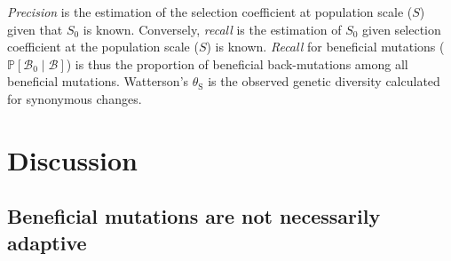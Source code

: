 \documentclass{article}
\newcommand{\proba}{\mathbb{P}}
\newcommand{\Sphy}{S_{0}}
\newcommand{\SphyBen}{\mathcal{B}_0}
\newcommand{\given}{\mid}
\newcommand{\Spop}{S}
\newcommand{\SpopBen}{\mathcal{B}}
\newcommand{\thetaSyn}{\theta_{\text{S}}}
\begin{document}
\begin{table}[tb]
{            \textit{Precision} is the estimation of the selection coefficient at population scale ($\Spop$) given that $\Sphy$ is known.
            Conversely, \textit{recall} is the estimation of $\Sphy$ given selection coefficient at the population scale ($\Spop$) is known.
            \textit{Recall} for beneficial mutations ($\proba [\SphyBen \given \SpopBen]$) is thus the proportion of beneficial back-mutations among all beneficial mutations.
            Watterson's $\thetaSyn$ is the observed genetic diversity calculated for synonymous changes.
        }
        \label{table:proba}
    \end{table}

    \section*{Discussion}
    \subsection*{Beneficial mutations are not necessarily adaptive}
\end{document}
